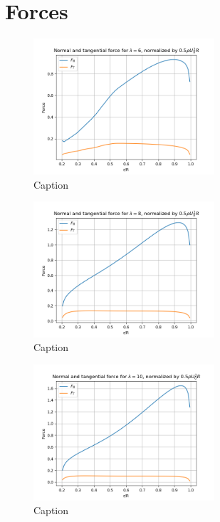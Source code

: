 \section{Forces}
\begin{figure}[H]
    \centering
    \includegraphics[width=0.6\textwidth]{Figures/F_t_F_n_6.png}
    \caption{Caption}
    \label{fig:enter-label}
\end{figure}\begin{figure}[H]
    \centering
    \includegraphics[width=0.6\textwidth]{Figures/Ft_Fn_8.png}
    \caption{Caption}
    \label{fig:enter-label}
\end{figure}\begin{figure}[H]
    \centering
    \includegraphics[width=0.6\textwidth]{Figures/Ft_Fn_10.png}
    \caption{Caption}
    \label{fig:enter-label}
\end{figure}

